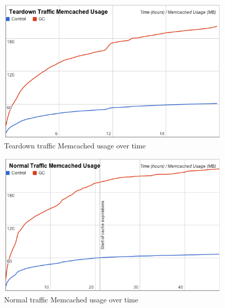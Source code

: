 \documentclass[12pt]{ucthesis}
\begin{document}
\begin{figure}[htp]
\centering
\includegraphics[width=\textwidth]{assets/teardownMemcachedUsageXTime.png}
\caption{Teardown traffic Memcached usage over time}
\label{fig:teardownMemcachedUsageXTime}
\end{figure}
\begin{figure}[htp]
\centering
\includegraphics[width=\textwidth]{assets/normalMemcachedUsageXTime.png}
\caption{Normal traffic Memcached usage over time}
\label{fig:normalMemcachedUsageXTime}
\end{figure}
\end{document}
